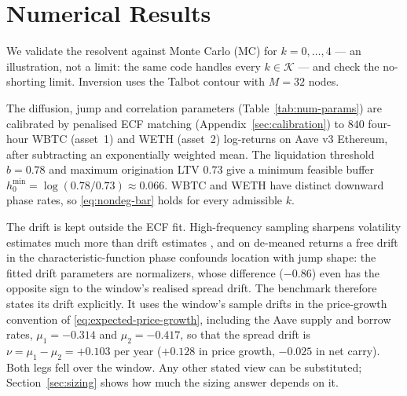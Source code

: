 \documentclass[11pt]{article}
\theoremstyle{plain}
\theoremstyle{definition}
\theoremstyle{remark}
\begin{document}
\section{Numerical Results}\label{sec:numerical}

We validate the resolvent against Monte Carlo (MC) for $k=0,\ldots,4$ --- an illustration, not a
limit: the same code handles every $k\in\mathcal K$ --- and check the no-shorting limit. Inversion
uses the Talbot contour \citep{Talbot1979} with $M=32$ nodes.

The diffusion, jump and correlation parameters (Table~\ref{tab:num-params}) are calibrated by
penalised ECF matching (Appendix~\ref{sec:calibration}) to $840$ four-hour WBTC (asset~1) and WETH
(asset~2) log-returns on Aave v3 Ethereum, after subtracting an exponentially weighted mean. The
liquidation threshold $b=0.78$ and maximum origination LTV $0.73$ give a minimum feasible buffer
$h_0^{\min}=\log(0.78/0.73)\approx0.066$. WBTC and WETH have distinct downward phase rates, so
\eqref{eq:nondeg-bar} holds for every admissible $k$.

The drift is kept outside the ECF fit. High-frequency sampling sharpens volatility estimates much
more than drift estimates \citep{Merton1980}, and on de-meaned returns a free drift in the
characteristic-function phase confounds location with jump shape: the fitted drift parameters are
normalizers, whose difference ($-0.86$) even has the opposite sign to the window's realised spread
drift. The benchmark therefore states its drift explicitly. It uses the window's sample drifts in
the price-growth convention of \eqref{eq:expected-price-growth}, including the Aave supply and borrow rates,
$\mu_1=-0.314$ and $\mu_2=-0.417$, so that the spread drift is $\nu=\mu_1-\mu_2=+0.103$ per year
($+0.128$ in price growth, $-0.025$ in net carry). Both legs fell over the window. Any other stated
view can be substituted; Section~\ref{sec:sizing} shows how much the sizing answer depends on it.
\end{document}
